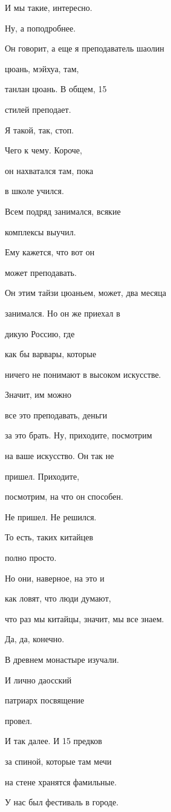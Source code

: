 И мы такие, интересно.

Ну, а поподробнее.

Он говорит, а еще я преподаватель шаолин

цюань, мэйхуа, там,

танлан цюань. В общем, 15

стилей преподает.

Я такой, так, стоп.

Чего к чему. Короче,

он нахватался там, пока

в школе учился.

Всем подряд занимался, всякие

комплексы выучил.

Ему кажется, что вот он

может преподавать.

Он этим тайзи цюаньем, может, два месяца

занимался. Но он же приехал в

дикую Россию, где

как бы варвары, которые

ничего не понимают в высоком искусстве.

Значит, им можно

все это преподавать, деньги

за это брать. Ну, приходите, посмотрим

на ваше искусство. Он так не

пришел. Приходите,

посмотрим, на что он способен.

Не пришел. Не решился.

То есть, таких китайцев

полно просто.

Но они, наверное, на это и

как ловят, что люди думают,

что раз мы китайцы, значит, мы все знаем.

Да, да, конечно.

В древнем монастыре изучали.

И лично даосский

патриарх посвящение

провел.

И так далее. И 15 предков

за спиной, которые там мечи

на стене хранятся фамильные.

У нас был фестиваль в городе.


